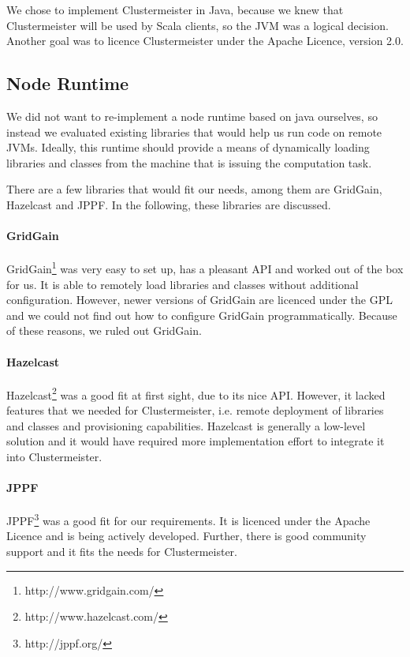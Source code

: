 \documentclass{article}
\begin{document}
We chose to implement Clustermeister in Java, because we knew that Clustermeister will be used by Scala clients, so the JVM was a logical decision. Another goal was to licence Clustermeister under the Apache Licence, version 2.0.

\subsection{Node Runtime}

We did not want to re-implement a node runtime based on java ourselves, so instead we evaluated existing libraries that would help us run code on remote JVMs. Ideally, this runtime should provide a means of dynamically loading libraries and classes from the machine that is issuing the computation task.

There are a few libraries that would fit our needs, among them are GridGain, Hazelcast and JPPF. In the following, these libraries are discussed.

\paragraph{GridGain} GridGain\footnote{http://www.gridgain.com/} was very easy to set up, has a pleasant API and worked out of the box for us. It is able to remotely load libraries and classes without additional configuration. However, newer versions of GridGain are licenced under the GPL and we could not find out how to configure GridGain programmatically. Because of these reasons, we ruled out GridGain.

\paragraph{Hazelcast} Hazelcast\footnote{http://www.hazelcast.com/} was a good fit at first sight, due to its nice API. However, it lacked features that we needed for Clustermeister, i.e. remote deployment of libraries and classes and provisioning capabilities. Hazelcast is generally a low-level solution and it would have required more implementation effort to integrate it into Clustermeister.

\paragraph{JPPF} JPPF\footnote{http://jppf.org/} was a good fit for our requirements. It is licenced under the Apache Licence and is being actively developed. Further, there is good community support and it fits the needs for Clustermeister.
\end{document}
